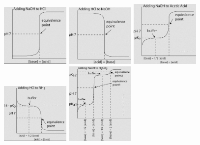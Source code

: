 \documentclass[10pt]{report}
\begin{document}
\begin{figure}
    \centering
    \includegraphics[width=0.3\textwidth]{mcat0.png}
    \includegraphics[width=0.3\textwidth]{mcat1.png}
    \includegraphics[width=0.3\textwidth]{mcat2.png}
    \includegraphics[width=0.3\textwidth]{mcat3.png}
    \includegraphics[width=0.3\textwidth]{mcat4.png}
\end{figure}
\end{document}
